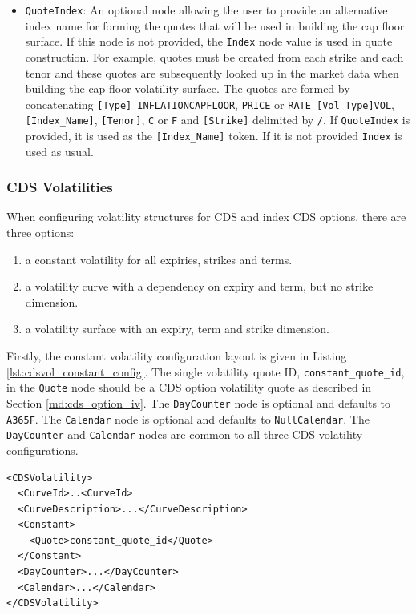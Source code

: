 \begin{itemize}
\item \lstinline!QuoteIndex!: An optional node allowing the user to provide an alternative index name for forming the quotes that will be used in building the cap floor surface. If this node is not provided, the \lstinline!Index! node value is used in quote construction. For example, quotes must be created from each strike and each tenor and these quotes are subsequently looked up in the market data when building the cap floor volatility surface. The quotes are formed by concatenating \lstinline![Type]_INFLATIONCAPFLOOR!, \lstinline!PRICE! or \lstinline!RATE_[Vol_Type]VOL!, \lstinline![Index_Name]!, \lstinline![Tenor]!, \lstinline!C! or \lstinline!F! and \lstinline![Strike]! delimited by \lstinline!/!. If \lstinline!QuoteIndex! is provided, it is used as the \lstinline![Index_Name]! token. If it is not provided \lstinline!Index! is used as usual.
\end{itemize}

\subsubsection{CDS Volatilities}

When configuring volatility structures for CDS and index CDS options, there are three options:
\begin{enumerate}
\item a constant volatility for all expiries, strikes and terms.
\item a volatility curve with a dependency on expiry and term, but no strike dimension.
\item a volatility surface with an expiry, term and strike dimension.
\end{enumerate}

Firstly, the constant volatility configuration layout is given in Listing \ref{lst:cdsvol_constant_config}. The single volatility quote ID, \lstinline!constant_quote_id!, in the \lstinline!Quote! node should be a CDS option volatility quote as described in Section \ref{md:cds_option_iv}. The \lstinline!DayCounter! node is optional and defaults to \lstinline!A365F!. The \lstinline!Calendar! node is optional and defaults to \lstinline!NullCalendar!. The \lstinline!DayCounter! and \lstinline!Calendar! nodes are common to all three CDS volatility configurations.

\begin{longlisting}
\begin{verbatim}
<CDSVolatility>
  <CurveId>..<CurveId>
  <CurveDescription>...</CurveDescription>
  <Constant>
    <Quote>constant_quote_id</Quote>
  </Constant>
  <DayCounter>...</DayCounter>
  <Calendar>...</Calendar>
</CDSVolatility>
\end{verbatim}
\caption{Constant CDS volatility configuration}
\label{lst:cdsvol_constant_config}
\end{longlisting}

